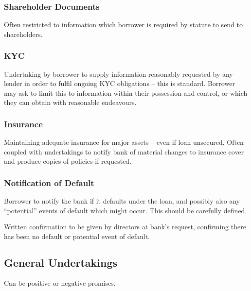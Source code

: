 \documentclass[
]{article}
\begin{document}
\hypertarget{shareholder-documents}{%
\subsubsection{Shareholder Documents}\label{shareholder-documents}}

Often restricted to information which borrower is required by statute to
send to shareholders.

\hypertarget{kyc}{%
\subsubsection{KYC}\label{kyc}}

Undertaking by borrower to supply information reasonably requested by
any lender in order to fulfil ongoing KYC obligations -- this is
standard. Borrower may ask to limit this to information within their
possession and control, or which they can obtain with reasonable
endeavours.

\hypertarget{insurance}{%
\subsubsection{Insurance}\label{insurance}}

Maintaining adequate insurance for major assets -- even if loan
unsecured. Often coupled with undertakings to notify bank of material
changes to insurance cover and produce copies of policies if requested.

\hypertarget{notification-of-default}{%
\subsubsection{Notification of Default}\label{notification-of-default}}

Borrower to notify the bank if it defaults under the loan, and possibly
also any ``potential'' events of default which might occur. This should
be carefully defined.

Written confirmation to be given by directors at bank's request,
confirming there has been no default or potential event of default.

\hypertarget{general-undertakings}{%
\subsection{General Undertakings}\label{general-undertakings}}

Can be positive or negative promises.
\end{document}
